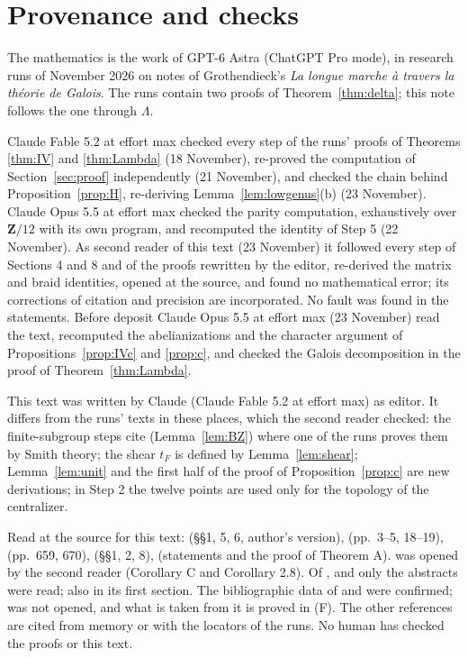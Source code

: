 \documentclass[11pt,a4paper]{article}
\theoremstyle{plain}
\theoremstyle{definition}
\theoremstyle{remark}
\newcommand{\Z}{\mathbf Z}
\begin{document}
\section*{Provenance and checks}

The mathematics is the work of GPT-6 Astra (ChatGPT Pro mode), in research runs of November 2026 on notes of
Grothendieck's \emph{La longue marche \`a travers la th\'eorie de Galois}. The runs contain two proofs of
Theorem~\ref{thm:delta}; this note follows the one through $\Lambda$.

Claude Fable 5.2 at effort max checked every step of the runs' proofs of Theorems \ref{thm:IV} and \ref{thm:Lambda}
(18 November), re-proved the computation of Section~\ref{sec:proof} independently (21 November), and checked the
chain behind Proposition~\ref{prop:H}, re-deriving Lemma~\ref{lem:lowgenus}(b) (23 November). Claude Opus 5.5 at
effort max checked the parity computation, exhaustively over $\Z/12$ with its own program, and recomputed the
identity of Step 5 (22 November). As second reader of this text (23 November) it followed every step of Sections
4 and 8 and of the proofs rewritten by the editor, re-derived the matrix and braid identities, opened
\cite{HMM} at the source, and found no mathematical error; its corrections of citation and precision are
incorporated. No fault was found in the statements. Before deposit Claude Opus 5.5 at effort max (23 November)
read the text, recomputed the abelianizations and the character argument of Propositions~\ref{prop:IVc} and
\ref{prop:c}, and checked the Galois decomposition in the proof of Theorem~\ref{thm:Lambda}.

This text was written by Claude (Claude Fable 5.2 at effort max) as editor. It differs from the runs' texts in
these places, which the second reader checked: the finite-subgroup steps cite \cite{BZ} (Lemma~\ref{lem:BZ}) where one
of the runs proves them by Smith theory; the shear $t_F$ is defined by Lemma~\ref{lem:shear}; Lemma~\ref{lem:unit}
and the first half of the proof of Proposition~\ref{prop:c} are new derivations; in Step 2 the twelve points are
used only for the topology of the centralizer.

Read at the source for this text: \cite{NS} (\S\S1, 5, 6, author's version), \cite{HLS} (pp.~3--5, 18--19),
\cite{S} (pp.~659, 670), \cite{LNS} (\S\S1, 2, 8), \cite{BZ} (statements and the proof of Theorem A). \cite{HMM} was
opened by the second reader (Corollary C and Corollary 2.8). Of \cite{BBR}, \cite{DG} and \cite{Co} only the
abstracts were read; \cite{BBR} also in its first section. The bibliographic data of \cite{As} and \cite{FR} were
confirmed; \cite{A} was not opened, and what is taken from it is proved in (F). The other references are cited
from memory or with the locators of the runs. No human has checked the proofs or this
text.
\end{document}
